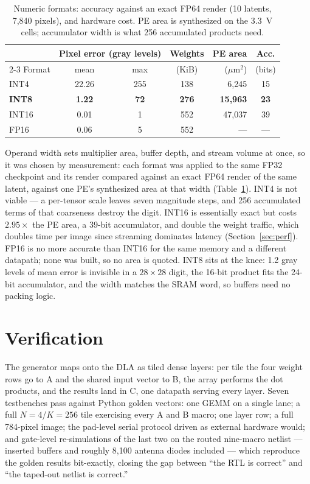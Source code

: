 \documentclass[conference,a4paper]{APSIPA2026}
\begin{document}
\begin{table}[!ht]
\caption{Numeric formats: accuracy against an exact FP64 render (10 latents, 7{,}840 pixels), and hardware cost. PE area is synthesized on the 3.3~V cells; accumulator width is what 256 accumulated products need.}
\label{tab:format}
\centering
\renewcommand{\arraystretch}{1.0}
\begin{tabular}{@{}lcccrc@{}}
\toprule
 & \multicolumn{2}{c}{Pixel error (gray levels)} & Weights & PE area & Acc. \\
\cmidrule(lr){2-3}
Format & mean & max & (KiB) & ($\mu$m$^2$) & (bits) \\
\midrule
INT4   & 22.26 & 255 & 138 & 6{,}245  & 15 \\
\textbf{INT8}  & \textbf{1.22} & \textbf{72} & \textbf{276} & \textbf{15{,}963} & \textbf{23} \\
INT16  & 0.01  & 1   & 552 & 47{,}037 & 39 \\
FP16   & 0.06  & 5   & 552 & ---      & --- \\
\bottomrule
\end{tabular}
\end{table}
Operand width sets multiplier area, buffer depth, and stream volume at once, so it was chosen by measurement: each format was applied to the same FP32 checkpoint and its render compared against an exact FP64 render of the same latent, against one PE's synthesized area at that width (Table~\ref{tab:format}). INT4 is not viable --- a per-tensor scale leaves seven magnitude steps, and 256 accumulated terms of that coarseness destroy the digit. INT16 is essentially exact but costs $2.95\times$ the PE area, a 39-bit accumulator, and double the weight traffic, which doubles time per image since streaming dominates latency (Section~\ref{sec:perf}). FP16 is no more accurate than INT16 for the same memory and a different datapath; none was built, so no area is quoted. INT8 sits at the knee: 1.2 gray levels of mean error is invisible in a $28\times28$ digit, the 16-bit product fits the 24-bit accumulator, and the width matches the SRAM word, so buffers need no packing logic.

\section{Verification}\label{sec:map}

The generator maps onto the DLA as tiled dense layers: per tile the four weight rows go to A and the shared input vector to B, the array performs the dot products, and the results land in C, one datapath serving every layer. Seven testbenches pass against Python golden vectors: one GEMM on a single lane; a full $N{=}4$/$K{=}256$ tile exercising every A and B macro; one layer row; a full 784-pixel image; the pad-level serial protocol driven as external hardware would; and gate-level re-simulations of the last two on the routed nine-macro netlist --- inserted buffers and roughly 8{,}100 antenna diodes included --- which reproduce the golden results bit-exactly, closing the gap between ``the RTL is correct'' and ``the taped-out netlist is correct.''
\end{document}
